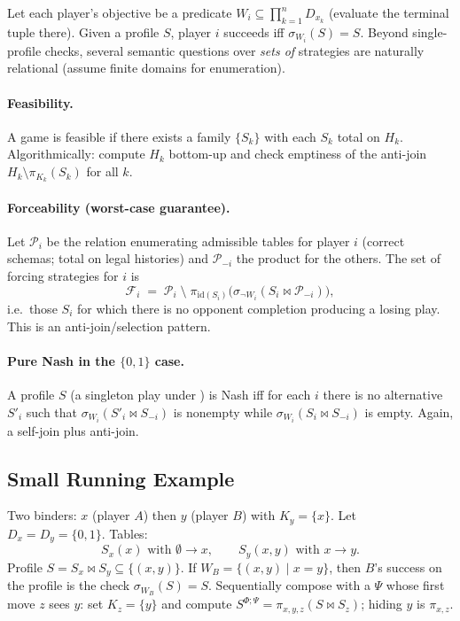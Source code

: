Let each player’s objective be a predicate
$W_i \subseteq \prod_{k=1}^n D_{x_k}$ (evaluate the terminal tuple there).
Given a profile $S$, player $i$ succeeds iff $\sigma_{W_i}(S)=S$.  Beyond
single-profile checks, several semantic questions over \emph{sets of}
strategies are naturally relational (assume finite domains for enumeration).

\paragraph{Feasibility.}
A game is feasible if there exists a family $\{S_k\}$ with each $S_k$ total on
$H_k$.  Algorithmically: compute $H_k$ bottom-up and check emptiness of the
anti-join $H_k \setminus \pi_{K_k}(S_k)$ for all $k$.

\paragraph{Forceability (worst-case guarantee).}
Let $\mathcal{P}_i$ be the relation enumerating admissible tables for player
$i$ (correct schemas; total on legal histories) and $\mathcal{P}_{-i}$ the
product for the others.  The set of forcing strategies for $i$ is
\[
  \mathcal{F}_i \;=\;
  \mathcal{P}_i \;\setminus\;
  \pi_{\text{id}(S_i)}
  \bigl(
    \sigma_{\neg W_i}( S_i \Join \mathcal{P}_{-i} )
  \bigr),
\]
i.e.\ those $S_i$ for which there is no opponent completion producing a losing
play.  This is an anti-join/selection pattern.

\paragraph{Pure Nash in the $\{0,1\}$ case.}
A profile $S$ (a singleton play under ) is
Nash iff for each $i$ there is no alternative $S'_i$ such that
$\sigma_{W_i}( S'_i \Join S_{-i})$ is nonempty while
$\sigma_{W_i}( S_i \Join S_{-i})$ is empty.  Again, a self-join plus
anti-join.

\subsection{Small Running Example}\label{subsec:ra-example}

Two binders: $x$ (player $A$) then $y$ (player $B$) with $K_y=\{x\}$.
Let $D_x=D_y=\{0,1\}$.  Tables:
\[
  S_x(x) \text{ with }\emptyset\to x,
  \qquad
  S_y(x,y) \text{ with } x\to y.
\]
Profile $S=S_x\Join S_y \subseteq \{(x,y)\}$.  If
$W_B=\{(x,y)\mid x=y\}$, then $B$’s success on the profile is the check
$\sigma_{W_B}(S)=S$.  Sequentially compose with a $\Psi$ whose first move
$z$ sees $y$: set $K_z=\{y\}$ and compute $S^{\Phi;\Psi} = \pi_{x,y,z}
(S \Join S_z)$; hiding $y$ is $\pi_{x,z}$.

